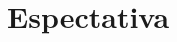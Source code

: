 \documentclass[journal,12pt,onecolumn]{IEEEtran}
\begin{document}



%
%
%
%
%
\section{Espectativa}



	
\end{document}
